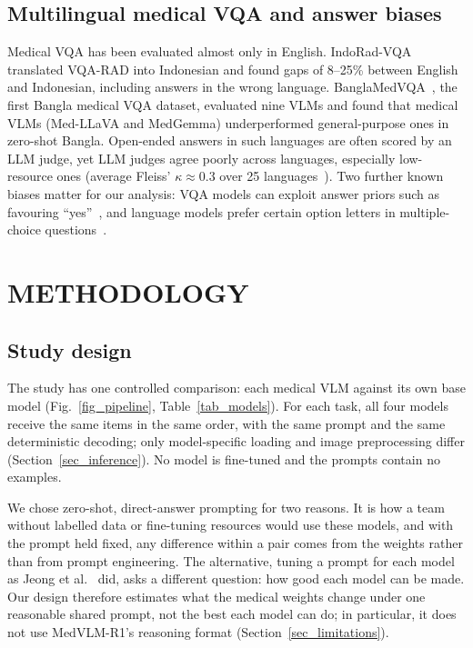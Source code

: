 \documentclass[doublecolumn]{ijcvsplatex}
\newcommand{\medvlm}{MedVLM-R1}
\begin{document}
\subsection{Multilingual medical VQA and answer biases}
Medical VQA has been evaluated almost only in English. IndoRad-VQA~\cite{indoradvqa2026} translated VQA-RAD into Indonesian and found gaps of 8--25\% between English and Indonesian, including answers in the wrong language. BanglaMedVQA~\cite{ahmed2026banglamedvqa}, the first Bangla medical VQA dataset, evaluated nine VLMs and found that medical VLMs (Med-LLaVA and MedGemma) underperformed general-purpose ones in zero-shot Bangla. Open-ended answers in such languages are often scored by an LLM judge, yet LLM judges agree poorly across languages, especially low-resource ones (average Fleiss' $\kappa\approx0.3$ over 25 languages~\cite{fu2025multilingualjudge}). Two further known biases matter for our analysis: VQA models can exploit answer priors such as favouring ``yes''~\cite{goyal2017vqav2}, and language models prefer certain option letters in multiple-choice questions~\cite{zheng2024mcqbias}.

\section{METHODOLOGY}
\label{sec_method}

\subsection{Study design}
\label{sec_design}
The study has one controlled comparison: each medical VLM against its own base model (Fig.~\ref{fig_pipeline}, Table~\ref{tab_models}). For each task, all four models receive the same items in the same order, with the same prompt and the same deterministic decoding; only model-specific loading and image preprocessing differ (Section~\ref{sec_inference}). No model is fine-tuned and the prompts contain no examples.

We chose zero-shot, direct-answer prompting for two reasons. It is how a team without labelled data or fine-tuning resources would use these models, and with the prompt held fixed, any difference within a pair comes from the weights rather than from prompt engineering. The alternative, tuning a prompt for each model as Jeong et al.~\cite{jeong2025limited} did, asks a different question: how good each model can be made. Our design therefore estimates what the medical weights change under one reasonable shared prompt, not the best each model can do; in particular, it does not use \medvlm{}'s reasoning format (Section~\ref{sec_limitations}).
\end{document}
